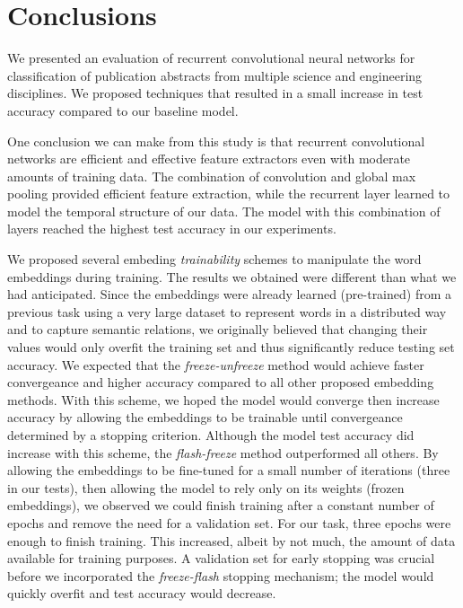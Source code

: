 
\chapter{Conclusions}
We presented an evaluation of recurrent convolutional neural networks for classification of publication abstracts from multiple science and
engineering disciplines. We proposed techniques that resulted in a small increase in test accuracy compared to our baseline model.

One conclusion we can make from this study is that recurrent convolutional networks are efficient and effective feature extractors even with
moderate amounts of training data. The combination of convolution and global max pooling provided efficient feature extraction, while the recurrent layer
learned to model the temporal structure of our data. The model with this combination of layers reached the highest test accuracy in our experiments.

We proposed several embeding \textit{trainability} schemes to manipulate the word embeddings during training.
The results we obtained were different than what we had anticipated. Since the embeddings were already learned (pre-trained) from a previous task
using a very large dataset to represent words in a distributed way and to capture semantic relations,
we originally believed that changing their values would only overfit the training set and thus significantly reduce testing set accuracy.
We expected that the \textit{freeze-unfreeze} method would achieve faster convergeance and higher accuracy compared to all other proposed embedding methods.
With this scheme, we hoped the model would converge then increase accuracy by allowing the embeddings to be trainable until convergeance determined by
a stopping criterion. Although the model test accuracy did increase with this scheme, the \textit{flash-freeze} method outperformed all others.
By allowing the embeddings to be fine-tuned for a small number of iterations (three in our tests), then allowing the model to rely
only on its weights (frozen embeddings), we observed we could finish training after a constant number of epochs and remove the need for a validation set.
For our task, three epochs were enough to finish training. This increased, albeit by not much, the amount of data available for training purposes.
A validation set for early stopping was crucial before we incorporated the \textit{freeze-flash} stopping mechanism; the model would quickly overfit and test accuracy
would decrease.

